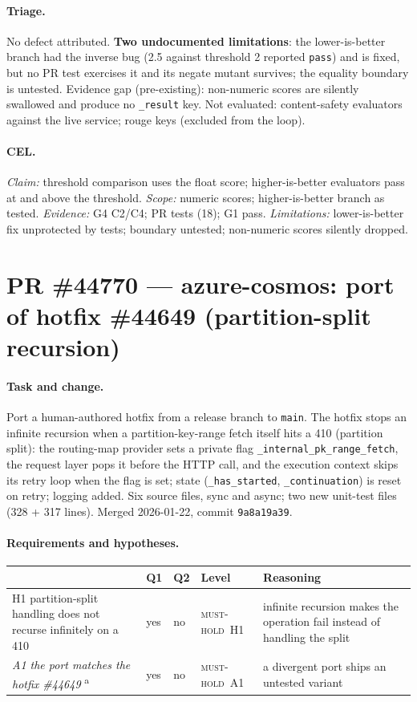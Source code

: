 \documentclass[11pt,a4paper]{article}
\newcommand{\code}[1]{\texttt{#1}}
\newcommand{\musthold}{\textsc{must-hold}}
\newcommand{\card}[1]{\clearpage\section{#1}}
\newcommand{\sub}[1]{\paragraph{#1}}
\begin{document}
\sub{Triage.} No defect attributed. \textbf{Two undocumented limitations}: the lower-is-better branch had the inverse bug (2.5 against threshold 2 reported \code{pass}) and is fixed, but no PR test exercises it and its negate mutant survives; the equality boundary is untested. Evidence gap (pre-existing): non-numeric scores are silently swallowed and produce no \code{\_result} key. Not evaluated: content-safety evaluators against the live service; rouge keys (excluded from the loop).

\sub{CEL.} \emph{Claim:} threshold comparison uses the float score; higher-is-better evaluators pass at and above the threshold. \emph{Scope:} numeric scores; higher-is-better branch as tested. \emph{Evidence:} G4 C2/C4; PR tests (18); G1 pass. \emph{Limitations:} lower-is-better fix unprotected by tests; boundary untested; non-numeric scores silently dropped.

\card{PR \#44770 — azure-cosmos: port of hotfix \#44649 (partition-split recursion)}

\sub{Task and change.} Port a human-authored hotfix from a release branch to \code{main}. The hotfix stops an infinite recursion when a partition-key-range fetch itself hits a 410 (partition split): the routing-map provider sets a private flag \code{\_internal\_pk\_range\_fetch}, the request layer pops it before the HTTP call, and the execution context skips its retry loop when the flag is set; state (\code{\_has\_started}, \code{\_continuation}) is reset on retry; logging added. Six source files, sync and async; two new unit-test files (328 + 317 lines). Merged 2026-01-22, commit \code{9a8a19a39}.

\sub{Requirements and hypotheses.}
\begin{center}\small\begin{tabularx}{\textwidth}{p{} l l l X}
\toprule & Q1 & Q2 & Level & Reasoning \\ \midrule
H1 partition-split handling does not recurse infinitely on a 410 & yes & no & \musthold\ H1 & infinite recursion makes the operation fail instead of handling the split \\
\emph{A1 the port matches the hotfix \#44649} \textsuperscript{a} & yes & no & \musthold\ A1 & a divergent port ships an untested variant \\
\bottomrule\end{tabularx}\end{center}
\end{document}
